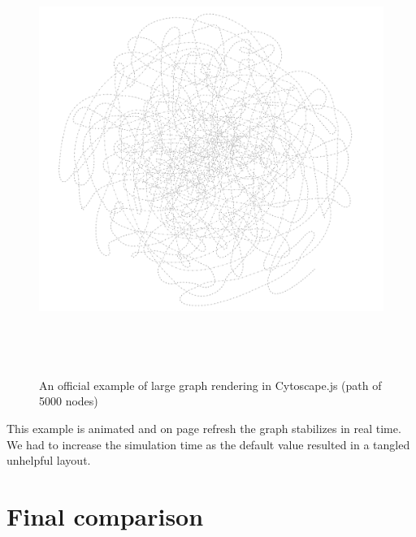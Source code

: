 \begin{figure}[p]\centering
  \includegraphics[width=140mm, height=140mm]{img/cytoscape_5000_path_official_demo.png}
  \caption{An official example of large graph rendering in Cytoscape.js (path of 5000 nodes)}
  \label{obr:cytoscape_5000_nodes_path}
\end{figure}

This example is animated and on page refresh the graph stabilizes in real time.
We had to increase the simulation time as the default value resulted in a tangled unhelpful layout. 



\section{Final comparison}

